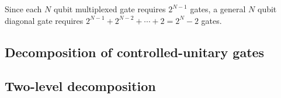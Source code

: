 Since each $N$ qubit multiplexed gate requires $2^{N-1}$  gates, a general $N$ qubit diagonal gate requires 
$2^{N-1}+2^{N-2}+\cdots+2=2^N-2$  gates.




\subsection{Decomposition of controlled-unitary gates}

\begin{center}
\end{center}



\subsection{Two-level  decomposition}



